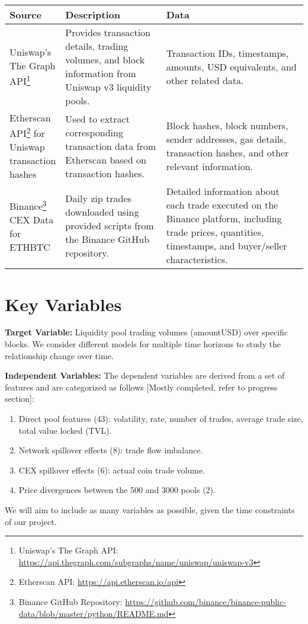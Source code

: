 \documentclass{article}
\begin{document}
{\begin{center}
\small
\begin{tabular}{|p{0.15\linewidth}|p{0.35\linewidth}|p{0.5\linewidth}|}
\hline
\textbf{Source} & \textbf{Description} & \textbf{Data} \\
\hline
Uniswap's The Graph API\footnote{Uniswap's The Graph API: \url{https://api.thegraph.com/subgraphs/name/uniswap/uniswap-v3}} & Provides transaction details, trading volumes, and block information from Uniswap v3 liquidity pools. & Transaction IDs, timestamps, amounts, USD equivalents, and other related data. \\
\hline
Etherscan API\footnote{Etherscan API: \url{https://api.etherscan.io/api}} for Uniswap transaction hashes & Used to extract corresponding transaction data from Etherscan based on transaction hashes. & Block hashes, block numbers, sender addresses, gas details, transaction hashes, and other relevant information. \\
\hline
Binance\footnote{Binance GitHub Repository: \url{https://github.com/binance/binance-public-data/blob/master/python/README.md}} CEX Data for ETHBTC & Daily zip trades downloaded using provided scripts from the Binance GitHub repository. & Detailed information about each trade executed on the Binance platform, including trade prices, quantities, timestamps, and buyer/seller characteristics. \\
\hline
\end{tabular}
\end{center}


\section*{Key Variables}
\textbf{Target Variable:} Liquidity pool trading volumes (amountUSD) over specific blocks. We consider different models for multiple time horizons to study the relationship change over time.

\textbf{Independent Variables:}
The dependent variables are derived from a set of features and are categorized as follows [Mostly completed, refer to progress section]:
\begin{enumerate}[label=\arabic*. ,itemsep=0pt, topsep=0pt]
\item Direct pool features (43): volatility, rate, number of trades, average trade size, total value locked (TVL).
\item Network spillover effects (8): trade flow imbalance.
\item CEX spillover effects (6): actual coin trade volume.
\item Price divergences between the 500 and 3000 pools (2).
\end{enumerate}
We will aim to include as many variables as possible, given the time constraints of our project.

}
\end{document}
